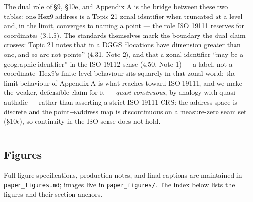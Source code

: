 \documentclass[
  11pt,
  a4paper,
]{article}
\begin{document}
The dual role of §9, §10e, and Appendix A is the bridge between these
two tables: one Hex9 address is a Topic 21 zonal identifier when
truncated at a level and, in the limit, converges to naming a point ---
the role ISO 19111 reserves for coordinates (3.1.5). The standards
themselves mark the boundary the dual claim crosses: Topic 21 notes that
in a DGGS ``locations have dimension greater than one, and so are not
points'' (4.31, Note 2), and that a zonal identifier ``may be a
geographic identifier'' in the ISO 19112 sense (4.50, Note 1) --- a
label, not a coordinate. Hex9's finite-level behaviour sits squarely in
that zonal world; the limit behaviour of Appendix A is what reaches
toward ISO 19111, and we make the weaker, defensible claim for it ---
\emph{quasi-continuous}, by analogy with quasi-authalic --- rather than
asserting a strict ISO 19111 CRS: the address space is discrete and the
point→address map is discontinuous on a measure-zero seam set (§10e), so
continuity in the ISO sense does not hold.

\begin{center}\rule{0.5\linewidth}{0.5pt}\end{center}

\subsection{Figures}\label{figures}

Full figure specifications, production notes, and final captions are
maintained in \texttt{paper\_figures.md}; images live in
\texttt{paper\_figures/}. The index below lists the figures and their
section anchors.
\end{document}
